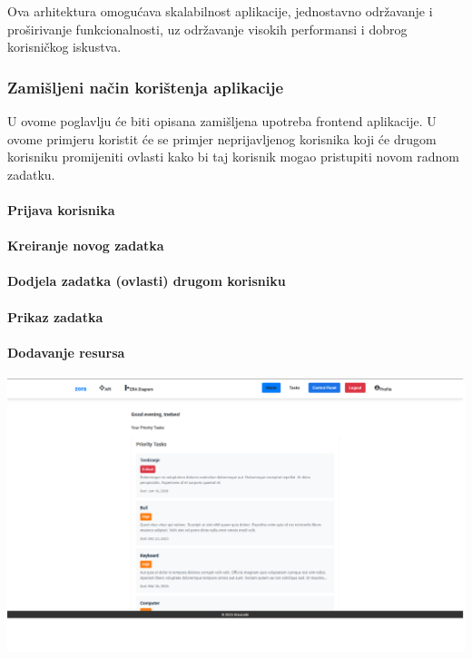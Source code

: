 \documentclass[a4paper,12pt]{article}
\begin{document}
Ova arhitektura omogućava skalabilnost aplikacije, jednostavno održavanje i proširivanje funkcionalnosti, uz održavanje visokih performansi i dobrog korisničkog iskustva.

\subsubsection{Zamišljeni način korištenja aplikacije}

U ovome poglavlju će biti opisana zamišljena upotreba frontend aplikacije. U ovome primjeru koristit će se primjer neprijavljenog korisnika koji će drugom korisniku promijeniti ovlasti kako bi taj korisnik mogao pristupiti novom radnom zadatku.

\paragraph{Prijava korisnika}

\paragraph{Kreiranje novog zadatka}

\paragraph{Dodjela zadatka (ovlasti) drugom korisniku}

\paragraph{Prikaz zadatka}

\paragraph{Dodavanje resursa}

\begin{center}
    \includegraphics[width=\textwidth]{frontend_example.png}
\end{center}
\end{document}
